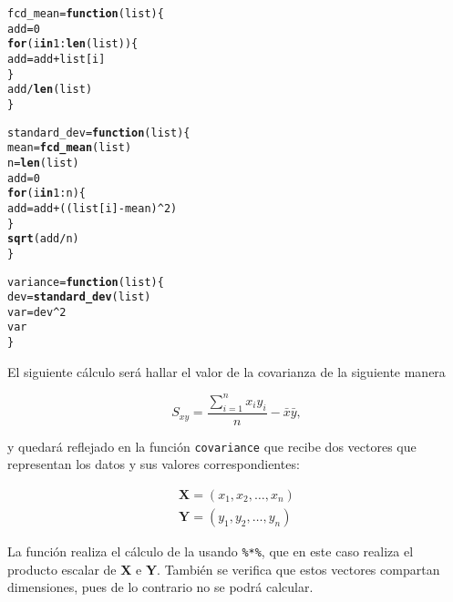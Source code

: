 \documentclass[12pt]{report}\usepackage[]{graphicx}\usepackage[dvipsnames]{xcolor}
\makeatletter
\newcommand{\hlnum}[1]{\textcolor[rgb]{0.686,0.059,0.569}{#1}}%
\newcommand{\hlopt}[1]{\textcolor[rgb]{0,0,0}{#1}}%
\newcommand{\hlstd}[1]{\textcolor[rgb]{0.345,0.345,0.345}{#1}}%
\newcommand{\hlkwa}[1]{\textcolor[rgb]{0.161,0.373,0.58}{\textbf{#1}}}%
\newcommand{\hlkwb}[1]{\textcolor[rgb]{0.69,0.353,0.396}{#1}}%
\newcommand{\hlkwc}[1]{\textcolor[rgb]{0.333,0.667,0.333}{#1}}%
\newcommand{\hlkwd}[1]{\textcolor[rgb]{0.737,0.353,0.396}{\textbf{#1}}}%
\newenvironment{kframe}{%
 \def\at@end@of@kframe{}%
 \ifinner\ifhmode%
  \def\at@end@of@kframe{\end{minipage}}%
  \begin{minipage}{\columnwidth}%
 \fi\fi%
 \def\FrameCommand##1{\hskip\@totalleftmargin \hskip-\fboxsep
 \colorbox{shadecolor}{##1}\hskip-\fboxsep
     \hskip-\linewidth \hskip-\@totalleftmargin \hskip\columnwidth}%
 \MakeFramed {\advance\hsize-\width
   \@totalleftmargin\z@ \linewidth\hsize
   \@setminipage}}%
 {\par\unskip\endMakeFramed%
 \at@end@of@kframe}
\newenvironment{knitrout}{}{} %
\makeatother
\begin{document}
\begin{knitrout}
\color{fgcolor}\begin{kframe}
\begin{alltt}
\hlstd{fcd_mean} \hlkwb{=} \hlkwa{function}\hlstd{(}\hlkwc{list}\hlstd{) \{}
        \hlstd{add} \hlkwb{=} \hlnum{0}
        \hlkwa{for} \hlstd{(i} \hlkwa{in} \hlnum{1}\hlopt{:}\hlkwd{len}\hlstd{(list)) \{}
                \hlstd{add} \hlkwb{=} \hlstd{add} \hlopt{+} \hlstd{list[i]}
        \hlstd{\}}
        \hlstd{add} \hlopt{/} \hlkwd{len}\hlstd{(list)}
\hlstd{\}}

\hlstd{standard_dev} \hlkwb{=} \hlkwa{function}\hlstd{(}\hlkwc{list}\hlstd{) \{}
        \hlstd{mean} \hlkwb{=} \hlkwd{fcd_mean}\hlstd{(list)}
        \hlstd{n} \hlkwb{=} \hlkwd{len}\hlstd{(list)}
        \hlstd{add} \hlkwb{=} \hlnum{0}
        \hlkwa{for} \hlstd{(i} \hlkwa{in} \hlnum{1}\hlopt{:}\hlstd{n) \{}
                \hlstd{add} \hlkwb{=} \hlstd{add} \hlopt{+} \hlstd{((list[i]} \hlopt{-} \hlstd{mean)}\hlopt{^}\hlnum{2}\hlstd{)}
        \hlstd{\}}
        \hlkwd{sqrt}\hlstd{(add}\hlopt{/}\hlstd{n)}
\hlstd{\}}

\hlstd{variance} \hlkwb{=} \hlkwa{function}\hlstd{(}\hlkwc{list}\hlstd{) \{}
        \hlstd{dev} \hlkwb{=} \hlkwd{standard_dev}\hlstd{(list)}
        \hlstd{var} \hlkwb{=} \hlstd{dev}\hlopt{^}\hlnum{2}
        \hlstd{var}
\hlstd{\}}
\end{alltt}
\end{kframe}
\end{knitrout}
 				
 				El siguiente cálculo será hallar el valor de la covarianza de la siguiente manera
 				
 				\begin{equation}\label{ec:reg_cov}
 					S_{xy} = \frac{\displaystyle\sum_{i=1}^nx_iy_i}{n} - \bar{x}\bar{y}, 
 				\end{equation}
 				
 				y quedará reflejado en la función \texttt{covariance} que recibe dos vectores que representan los datos y sus valores correspondientes: 
 				
 				$$
 				\begin{gathered}
 					\textbf{X} = (x_1, x_2, \hdots, x_n)\\
 					\textbf{Y} = (y_1, y_2, \hdots, y_n)
 				\end{gathered}
 				$$
 				
 				La función realiza el cálculo de la  usando \texttt{\%*\%}, que en este caso realiza el producto escalar de \textbf{X} e \textbf{Y}. También se verifica que estos vectores compartan dimensiones, pues de lo contrario no se podrá calcular. 
 				
\end{document}
